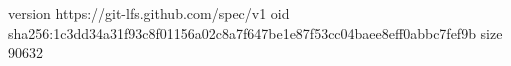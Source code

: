 version https://git-lfs.github.com/spec/v1
oid sha256:1c3dd34a31f93c8f01156a02c8a7f647be1e87f53cc04baee8eff0abbc7fef9b
size 90632
